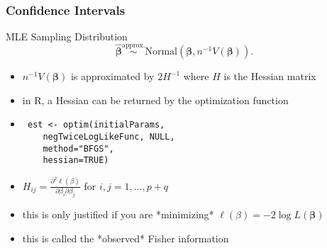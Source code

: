 \documentclass{beamer}
\begin{document}
\begin{frame}[fragile]
\frametitle{Confidence Intervals}

\begin{block}{MLE Sampling Distribution}
\[
\hat{\bm{\beta}} \overset{\text{approx.}}{\sim} \text{Normal}(\bm{\beta}, n^{-1}V(\bm{\beta})).
\]
\end{block}
\begin{itemize}
\item $n^{-1}V(\bm{\beta})$ is approximated by $2H^{-1}$ where $H$ is the Hessian matrix 
\item in R, a Hessian can be returned by the optimization function
\item \begin{verbatim} est <- optim(initialParams, 
    negTwiceLogLikeFunc, NULL, 
    method="BFGS", 
    hessian=TRUE) \end{verbatim} 
\item $H_{ij} = \frac{\partial^2 \ell(\beta) }{\partial \beta_i \partial \beta_j}$ for $i,j =1,\ldots,p+q$
\item this is only justified if you are *minimizing* $\ell(\beta) = -2\log L(\bm{\beta})$
\item this is called the *observed* Fisher information
\end{itemize}

\end{frame}
\end{document}

